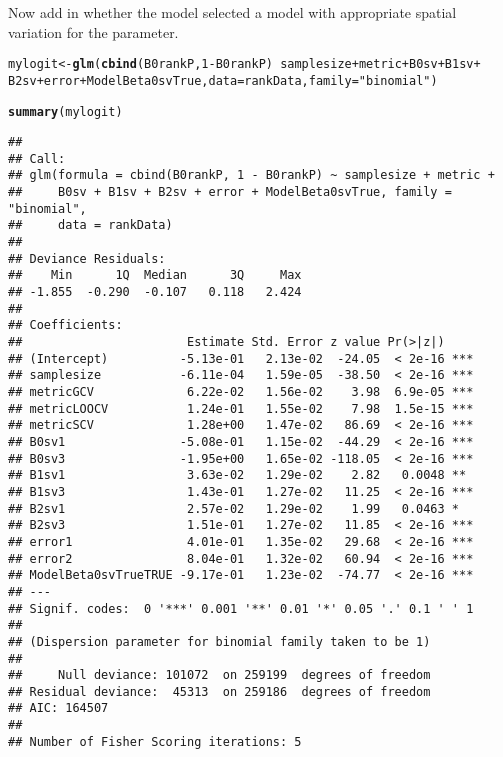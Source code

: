 \documentclass{article}\usepackage[]{graphicx}\usepackage[]{color}
\makeatletter
\newcommand{\hlnum}[1]{\textcolor[rgb]{0.686,0.059,0.569}{#1}}%
\newcommand{\hlstr}[1]{\textcolor[rgb]{0.192,0.494,0.8}{#1}}%
\newcommand{\hlopt}[1]{\textcolor[rgb]{0,0,0}{#1}}%
\newcommand{\hlstd}[1]{\textcolor[rgb]{0.345,0.345,0.345}{#1}}%
\newcommand{\hlkwb}[1]{\textcolor[rgb]{0.69,0.353,0.396}{#1}}%
\newcommand{\hlkwc}[1]{\textcolor[rgb]{0.333,0.667,0.333}{#1}}%
\newcommand{\hlkwd}[1]{\textcolor[rgb]{0.737,0.353,0.396}{\textbf{#1}}}%
\newenvironment{kframe}{%
 \def\at@end@of@kframe{}%
 \ifinner\ifhmode%
  \def\at@end@of@kframe{\end{minipage}}%
  \begin{minipage}{\columnwidth}%
 \fi\fi%
 \def\FrameCommand##1{\hskip\@totalleftmargin \hskip-\fboxsep
 \colorbox{shadecolor}{##1}\hskip-\fboxsep
     \hskip-\linewidth \hskip-\@totalleftmargin \hskip\columnwidth}%
 \MakeFramed {\advance\hsize-\width
   \@totalleftmargin\z@ \linewidth\hsize
   \@setminipage}}%
 {\par\unskip\endMakeFramed%
 \at@end@of@kframe}
\newenvironment{knitrout}{}{} %
\makeatother
\begin{document}
Now add in whether the model selected a model with appropriate spatial variation for the parameter.
\begin{knitrout}
\color{fgcolor}\begin{kframe}
\begin{alltt}
\hlstd{mylogit} \hlkwb{<-} \hlkwd{glm}\hlstd{(}\hlkwd{cbind}\hlstd{(B0rankP,} \hlnum{1} \hlopt{-} \hlstd{B0rankP)} \hlopt{~} \hlstd{samplesize} \hlopt{+} \hlstd{metric} \hlopt{+} \hlstd{B0sv} \hlopt{+} \hlstd{B1sv} \hlopt{+}
    \hlstd{B2sv} \hlopt{+} \hlstd{error} \hlopt{+} \hlstd{ModelBeta0svTrue,} \hlkwc{data} \hlstd{= rankData,} \hlkwc{family} \hlstd{=} \hlstr{"binomial"}\hlstd{)}
\end{alltt}


{\ttfamily\noindent\color{warningcolor}{\#\# Warning: non-integer counts in a binomial glm!}}\begin{alltt}
\hlkwd{summary}\hlstd{(mylogit)}
\end{alltt}
\begin{verbatim}
## 
## Call:
## glm(formula = cbind(B0rankP, 1 - B0rankP) ~ samplesize + metric + 
##     B0sv + B1sv + B2sv + error + ModelBeta0svTrue, family = "binomial", 
##     data = rankData)
## 
## Deviance Residuals: 
##    Min      1Q  Median      3Q     Max  
## -1.855  -0.290  -0.107   0.118   2.424  
## 
## Coefficients:
##                       Estimate Std. Error z value Pr(>|z|)    
## (Intercept)          -5.13e-01   2.13e-02  -24.05  < 2e-16 ***
## samplesize           -6.11e-04   1.59e-05  -38.50  < 2e-16 ***
## metricGCV             6.22e-02   1.56e-02    3.98  6.9e-05 ***
## metricLOOCV           1.24e-01   1.55e-02    7.98  1.5e-15 ***
## metricSCV             1.28e+00   1.47e-02   86.69  < 2e-16 ***
## B0sv1                -5.08e-01   1.15e-02  -44.29  < 2e-16 ***
## B0sv3                -1.95e+00   1.65e-02 -118.05  < 2e-16 ***
## B1sv1                 3.63e-02   1.29e-02    2.82   0.0048 ** 
## B1sv3                 1.43e-01   1.27e-02   11.25  < 2e-16 ***
## B2sv1                 2.57e-02   1.29e-02    1.99   0.0463 *  
## B2sv3                 1.51e-01   1.27e-02   11.85  < 2e-16 ***
## error1                4.01e-01   1.35e-02   29.68  < 2e-16 ***
## error2                8.04e-01   1.32e-02   60.94  < 2e-16 ***
## ModelBeta0svTrueTRUE -9.17e-01   1.23e-02  -74.77  < 2e-16 ***
## ---
## Signif. codes:  0 '***' 0.001 '**' 0.01 '*' 0.05 '.' 0.1 ' ' 1
## 
## (Dispersion parameter for binomial family taken to be 1)
## 
##     Null deviance: 101072  on 259199  degrees of freedom
## Residual deviance:  45313  on 259186  degrees of freedom
## AIC: 164507
## 
## Number of Fisher Scoring iterations: 5
\end{verbatim}
\end{kframe}
\end{knitrout}
\end{document}
